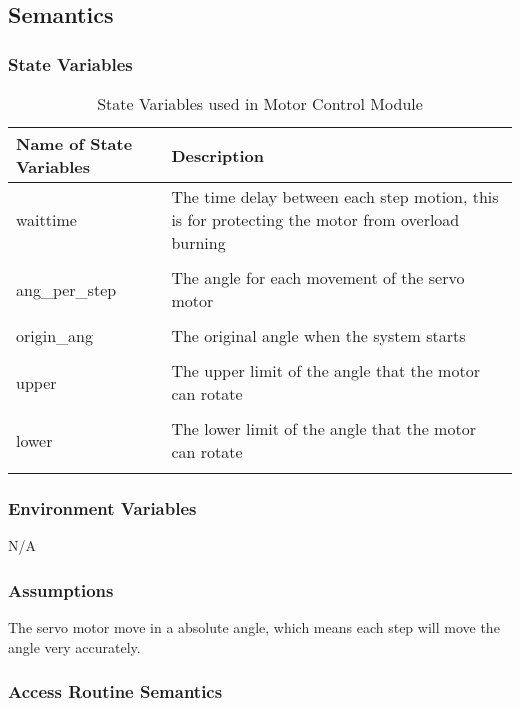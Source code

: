\documentclass[12pt, titlepage]{article}
\begin{document}
\subsection{Semantics}

\subsubsection{State Variables}

\begin{table}[H]
\caption{State Variables used in Motor Control Module} 
\begin{tabularx}{\textwidth}{XX}
\toprule
\textbf{Name of State Variables} & \textbf{Description}\\
\midrule
waittime & The time delay between each step motion, this is for protecting the motor from overload burning\\\\
ang_per_step & The angle for each movement of the servo motor\\\\
origin_ang & The original angle when the system starts \\\\
upper & The upper limit of the angle that the motor can rotate\\\\
lower & The lower limit of the angle that the motor can rotate\\\\


\bottomrule
\end{tabularx}
\end{table}


\subsubsection{Environment Variables}

N/A

\subsubsection{Assumptions}

The servo motor move in a absolute angle, which means each step will move the angle very accurately.

\subsubsection{Access Routine Semantics}
\end{document}
